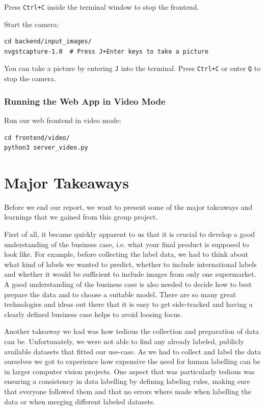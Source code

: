 Press \texttt{Ctrl+C} inside the terminal window to stop the frontend.

Start the camera:

\begin{lstlisting}[style=bash]
cd backend/input_images/
nvgstcapture-1.0  # Press J+Enter keys to take a picture
\end{lstlisting}

You can take a picture by entering \texttt{J} into the terminal. Press \texttt{Ctrl+C} or enter \texttt{Q} to stop the camera.

\subsubsection*{Running the Web App in Video Mode}

Run our web frontend in video mode:

\lstset{style=bash}
\begin{lstlisting}
cd frontend/video/
python3 server_video.py
\end{lstlisting}
\newpage

\section{Major Takeaways}
\label{ch:Discussion}
Before we end our report, we want to present some of the major takeaways and learnings that we gained from this group project.

First of all, it became quickly apparent to us that it is crucial to develop a good understanding of the business case, i.e. what your final product is supposed to look like. For example, before collecting the label data, we had to think about what kind of labels we wanted to predict, whether to include international labels and whether it would be sufficient to include images from only one supermarket. A good understanding of the business case is also needed to decide how to best prepare the data and to choose a suitable model. There are so many great technologies and ideas out there that it is easy to get side-tracked and having a clearly defined business case helps to avoid loosing focus. 

Another takeaway we had was how tedious the collection and preparation of data can be. Unfortunately, we were not able to find any already labeled, publicly available datasets that fitted our use-case. As we had to collect and label the data ourselves we got to experience how expensive the need for human labelling can be in larger computer vision projects. One aspect that was particularly tedious was ensuring  a consistency in data labelling by defining labeling rules, making sure that everyone followed them and that no errors where made when labelling the data or when merging different labeled datasets. 

